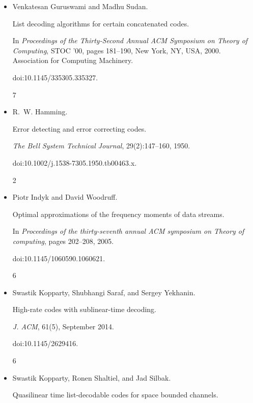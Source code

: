\documentclass[10pt,a4paper]{article}
\begin{document}
\begin{itemize}
doi:10.1145/2936015.


6




\item[] 
[16]

Venkatesan Guruswami and Madhu Sudan.


List decoding algorithms for certain concatenated codes.


In \emph{Proceedings of the Thirty-Second Annual ACM Symposium on
Theory of Computing}, STOC ’00, pages 181–190, New York, NY, USA, 2000.
Association for Computing Machinery.


doi:10.1145/335305.335327.


7




\item[] 
[17]

R. W. Hamming.


Error detecting and error correcting codes.


\emph{The Bell System Technical Journal}, 29(2):147–160, 1950.


doi:10.1002/j.1538-7305.1950.tb00463.x.


2




\item[] 
[18]

Piotr Indyk and David Woodruff.


Optimal approximations of the frequency moments of data streams.


In \emph{Proceedings of the thirty-seventh annual ACM symposium on
Theory of computing}, pages 202–208, 2005.


doi:10.1145/1060590.1060621.


6




\item[] 
[19]

Swastik Kopparty, Shubhangi Saraf, and Sergey Yekhanin.


High-rate codes with sublinear-time decoding.


\emph{J. ACM}, 61(5), September 2014.


doi:10.1145/2629416.


6




\item[] 
[20]

Swastik Kopparty, Ronen Shaltiel, and Jad Silbak.


Quasilinear time list-decodable codes for space bounded channels.



\end{itemize}
\end{document}

